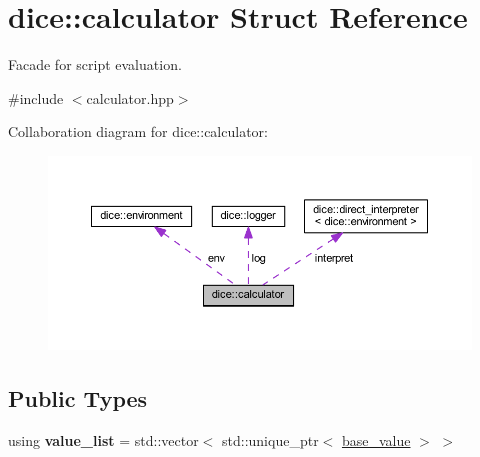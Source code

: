\hypertarget{structdice_1_1calculator}{}\section{dice\+:\+:calculator Struct Reference}
\label{structdice_1_1calculator}


Facade for script evaluation.  




{\ttfamily \#include $<$calculator.\+hpp$>$}



Collaboration diagram for dice\+:\+:calculator\+:\nopagebreak
\begin{figure}[H]
\begin{center}
\leavevmode
\includegraphics[width=350pt]{structdice_1_1calculator__coll__graph}
\end{center}
\end{figure}
\subsection*{Public Types}
\begin{DoxyCompactItemize}
\item 
\mbox{\label{structdice_1_1calculator_a1dd6c840953d7d7a8523b9e3637d61a0}} 
using {\bfseries value\+\_\+list} = std\+::vector$<$ std\+::unique\+\_\+ptr$<$ \mbox{\hyperlink{classdice_1_1base__value}{base\+\_\+value}} $>$ $>$
\end{DoxyCompactItemize}
